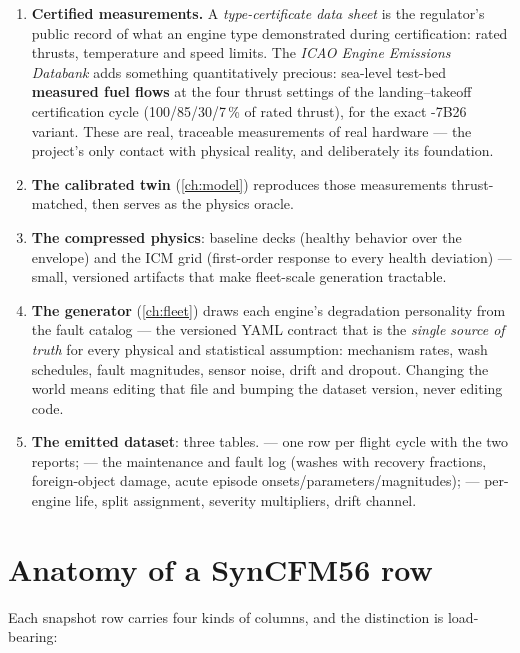 \begin{enumerate}
  \item \textbf{Certified measurements.} A \emph{type-certificate data sheet} is the
    regulator's public record of what an engine type demonstrated during certification:
    rated thrusts, temperature and speed limits. The \emph{ICAO Engine Emissions
    Databank} adds something quantitatively precious: sea-level test-bed \textbf{measured
    fuel flows} at the four thrust settings of the landing--takeoff certification cycle
    (100/85/30/7\,\% of rated thrust), for the exact -7B26 variant. These are real,
    traceable measurements of real hardware --- the project's only contact with physical
    reality, and deliberately its foundation.
  \item \textbf{The calibrated twin} (\cref{ch:model}) reproduces those measurements
    thrust-matched, then serves as the physics oracle.
  \item \textbf{The compressed physics}: baseline decks (healthy behavior over the
    envelope) and the ICM grid (first-order response to every health deviation) ---
    small, versioned artifacts that make fleet-scale generation tractable.
  \item \textbf{The generator} (\cref{ch:fleet}) draws each engine's degradation
    personality from the fault catalog --- the versioned YAML contract that is the
    \emph{single source of truth} for every physical and statistical assumption:
    mechanism rates, wash schedules, fault magnitudes, sensor noise, drift and dropout.
    Changing the world means editing that file and bumping the dataset version, never
    editing code.
  \item \textbf{The emitted dataset}: three tables.  --- one row
    per flight cycle with the two reports;  --- the maintenance
    and fault log (washes with recovery fractions, foreign-object damage, acute episode
    onsets/parameters/magnitudes);  --- per-engine life, split
    assignment, severity multipliers, drift channel.
\end{enumerate}

\section{Anatomy of a SynCFM56 row}
\label{sec:row-anatomy}

Each snapshot row carries four kinds of columns, and the distinction is load-bearing:

